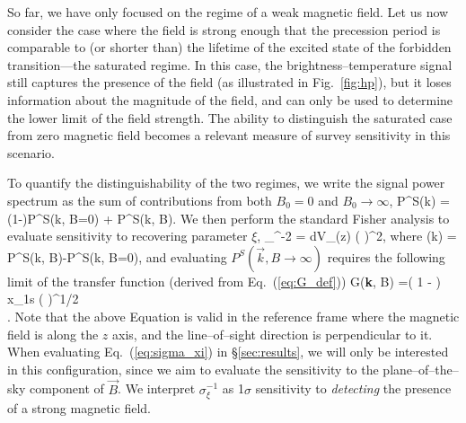 So far, we have only focused on the regime of a weak magnetic field. Let us now consider the case where the field is strong enough that the precession period is comparable to (or shorter than) the lifetime of the excited state of the forbidden transition---the saturated regime. In this case, the brightness--temperature signal still captures the presence of the field (as illustrated in Fig.~\ref{fig:hp}), but it loses information about the magnitude of the field, and can only be used to determine the lower limit of the field strength. The ability to distinguish the saturated case from zero magnetic field becomes a relevant measure of survey sensitivity in this scenario. 

To quantify the distinguishability of the two regimes, we write the signal power spectrum as the sum of contributions from both $B_0=0$ and $B_0\to\infty$, 
\beq
P^S(\vec k) = (1-\xi)P^S(\vec k, B=0) + \xi P^S(\vec k, B\to \infty).
\label{eq:saturated_P}
\eeq
We then perform the standard Fisher analysis to evaluate sensitivity to recovering parameter $\xi$,
\beq
\bga
\sigma_{\xi}^{-2} = 
\int dV_\mathrm{}(z)
\left(  \right)^2,
\ega
\label{eq:sigma_xi}
\eeq
where
\beq
{}(\vec k) = P^S(\vec k, B\to \infty)-P^S(\vec k, B=0),
\eeq
and evaluating $P^S(\vec k, B\to \infty)$ requires the following limit of the transfer function (derived from Eq.~(\ref{eq:G_def}))
\beq
\bga
G({\bf{\widehat k}}, B\to \infty)
=\left( 1 -  \right) x_{1{\rm s}} \left(  \right)^{1/2} \\
\times {}.
\label{eq:G_Binf}
\ega
\eeq
Note that the above Equation is valid in the reference frame where the magnetic field is along the $z$ axis, and the line--of--sight direction is perpendicular to it. When evaluating Eq.~(\ref{eq:sigma_xi}) in \S\ref{sec:results}, we will only be interested in this configuration, since we aim to evaluate the sensitivity to the plane--of--the--sky component of $\vec B$. We interpret $\sigma_\xi^{-1}$ as 1$\sigma$ sensitivity to \textit{detecting} the presence of a strong magnetic field. 

